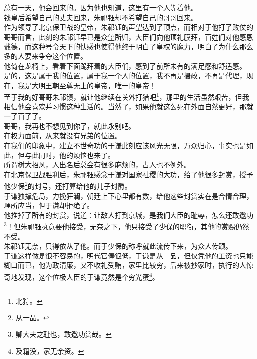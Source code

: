 \begin{multicols}{\theparacolNo}
总有一天，他会回来的。因为他也知道，这里有一个人等着他。\\

钱皇后希望自己的丈夫回来，朱祁钰却不希望自己的哥哥回来。\\

作为领导了北京保卫战的皇帝，朱祁钰的声望达到了顶点，而相对于他打了败仗的哥哥而言，此刻的朱祁钰早已是众望所归，大臣们向他顶礼膜拜，百姓们对他感恩戴德，而这种号令天下的快感也使得他终于明白了皇权的魔力，明白了为什么那么多的人要来争夺这个位置。\\

他倚在龙椅上，看着下面跪拜着的大臣们，感到了前所未有的满足感和舒适感。\\

是的，这是属于我的位置，属于我一个人的位置，我不再是摄政，不再是代理，现在，我是大明王朝至尊无上的皇帝，唯一的皇帝！\\

至于我的好哥哥朱祁镇，就让他继续在关外打猎吧\footnote{北狩。}，那里的生活虽然艰苦，但我相信他会喜欢并习惯这种生活的。当然了，如果他就这么死在外面自然更好，那就一了百了了。\\

哥哥，我再也不想见到你了，就此永别吧。\\

在权力面前，从来就没有兄弟的位置。\\

在我们的印象中，建立不世奇功的于谦此刻应该风光无限，万众归心，事实也是如此，但与此同时，他的烦恼也来了。\\

所谓树大招风，人出名后总会有很多麻烦的，古人也不例外。\\

在北京保卫战胜利后，朱祁钰感念于谦对国家社稷的大功，给了他很多封赏，授予他少保\footnote{从一品。}的封号，还打算给他的儿子封爵。\\

于谦独撑危局，力挽狂澜，朝廷上下心里都有数，给他这些封赏实在是合情合理，理所应当，但于谦却拒绝了。\\

他推掉了所有的封赏，说道：让敌人打到京城，是我们大臣的耻辱，怎么还敢邀功\footnote{卿大夫之耻也，敢邀功赏哉。}！但朱祁钰执意要他接受，无奈之下，他只接受了少保的职衔，其他的赏赐仍然不受。\\

朱祁钰无奈，只得依从了他。而于少保的称呼就此流传下来，为众人传颂。\\

于谦这样做是很不容易的，明代官俸很低，于谦是从一品，但仅凭他的工资也只能糊口而已，他为政清廉，又不收礼受贿，家里比较穷，后来被抄家时，执行的人惊奇地发现，这个位极人臣的于谦竟然是个穷光蛋\footnote{及籍没，家无余资。}。\\


\end{multicols}

